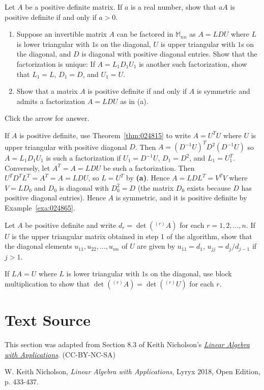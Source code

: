 \documentclass{ximera}
\begin{document}
\begin{problem}\label{prob:pos_def_11}
Let $A$ be a positive definite matrix. If $a$ is a real number, show that $aA$ is positive definite if and only if $a > 0$.
\end{problem}

\begin{problem}\label{prob:pos_def_12}
\begin{enumerate}
\item Suppose an invertible matrix $A$ can be factored in $\mathbb{M}_{nn}$ as $A = LDU$ where $L$ is lower triangular with $1$s on the diagonal, $U$ is upper triangular with $1$s on the diagonal, and $D$ is diagonal with positive diagonal entries. Show that the factorization is unique: If $A = L_{1}D_{1}U_{1}$ is another such factorization, show that $L_{1} = L$, $D_{1} = D$, and $U_{1} = U$.

\item Show that a matrix $A$ is positive definite if and only if $A$ is symmetric and admits a factorization $A = LDU$ as in (a).
\end{enumerate}

Click the arrow for answer.
\begin{expandable}
If $A$ is positive definite, use Theorem~\ref{thm:024815} to write $A = U^{T}U$ where $U$ is upper triangular with positive diagonal $D$. Then $A = (D^{-1}U)^{T}D^{2}(D^{-1}U)$ so $A = L_{1}D_{1}U_{1}$ is such a factorization if $U_{1} = D^{-1}U$, $D_{1} = D^{2}$, and $L_{1} = U^T_1$. Conversely, let $A^{T} = A = LDU$ be such a factorization. Then $U^{T}D^{T}L^{T} = A^{T} = A = LDU$, so $L = U^{T}$ by \textbf{(a)}. Hence $A = LDL^{T} = V^{T}V$ where $V = LD_{0}$ and $D_{0}$ is diagonal with $D^2_0 = D$ (the matrix $D_{0}$ exists because $D$ has positive diagonal entries). Hence $A$ is symmetric, and it is positive definite by Example~\ref{exa:024865}.
\end{expandable}
\end{problem}


\begin{problem}\label{prob:pos_def_13}
Let $A$ be positive definite and write $d_{r} = \det{\left(^{(r)}A\right)}$ for each $r = 1, 2, \dots, n$. If $U$ is the upper triangular matrix obtained in step 1 of the algorithm, show that the diagonal elements $u_{11}, u_{22}, \dots, u_{nn}$ of $U$ are given by $u_{11} = d_{1}$, $u_{jj} = d_{j} / d_{j-1}$ if $j > 1$. 
\begin{hint}
If $LA = U$ where $L$ is lower triangular with $1$s on the diagonal, use block multiplication to show that $\det{\left(^{(r)}A\right)} = \det{\left(^{(r)}U\right)}$ for each $r$.
\end{hint}
\end{problem}

\section*{Text Source} This section was adapted from Section 8.3 of Keith Nicholson's \href{https://open.umn.edu/opentextbooks/textbooks/linear-algebra-with-applications}{\it Linear Algebra with Applications}. (CC-BY-NC-SA)

W. Keith Nicholson, {\it Linear Algebra with Applications}, Lyryx 2018, Open Edition, p. 433-437.
\end{document}
